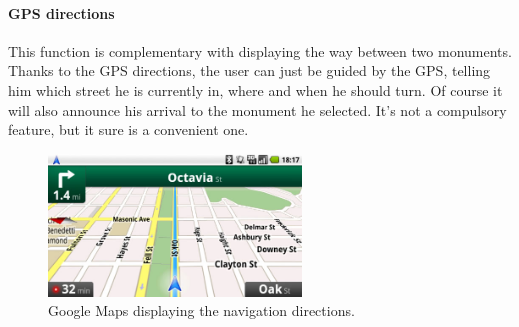 \paragraph{GPS directions} This function is complementary with displaying the way between two monuments. Thanks to the GPS directions, the user can just be guided by the GPS, telling him which street he is currently in, where and when he should turn. Of course it will also announce his arrival to the monument he selected. It's not a compulsory feature, but it sure is a convenient one.
\begin{figure}[h!]
	\centering
	\includegraphics[width=0.6\textwidth]{input/directions.png}
	\caption{Google Maps displaying the navigation directions.}
	\label{fig:directions}
\end{figure}